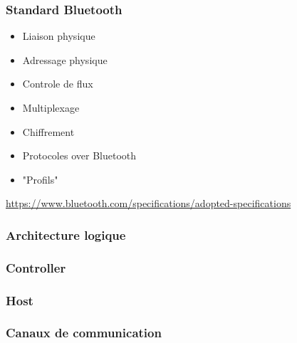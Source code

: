 \begin{frame}
	\frametitle{Standard Bluetooth}
	\vspace{0.5cm}
	\begin{itemize}
		\item Liaison physique
		\item Adressage physique
		\item Controle de flux
		\item Multiplexage
		\item Chiffrement
		\item Protocoles over Bluetooth
		\item "Profils"
	\end{itemize}
	\vspace{0.5cm}
	\tiny{\url{https://www.bluetooth.com/specifications/adopted-specifications}}
\end{frame}


\begin{frame}
	\frametitle{Architecture logique}
\end{frame}

\begin{frame}
	\frametitle{Controller}
\end{frame}

\begin{frame}
	\frametitle{Host}
\end{frame}

\begin{frame}
	\frametitle{Canaux de communication}
\end{frame}

